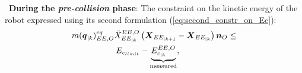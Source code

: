\documentclass[letterpaper, 10 pt, conference]{ieeeconf}      %
\newcommand{\vect}[1]{\mbox{\boldmath${#1}$}}%
\begin{document}
%
%
%
%
%
%
%
%
\textbullet\ \textbf{During the \textit{pre-collision} phase}: 
The constraint on the kinetic energy of the robot expressed using its second formulation (\ref{eq:second_constr_on_Ec}): 
\begin{equation} 
\begin{align*}
m(\vect{q}_{|k})_{EE,O}^{eq} \ddot{X}_{EE_{|k}}^{EE,O} &\left(\vect{X}_{EE_{|k+1}} - \vect{X}_{EE_{|k}}\right) \vect{n}_O \leq \\
\hspace{-10mm}E_{c_{limit}} &- \underbrace{E_{c_{|k}}^{EE,O}}_{\textnormal{measured}},
\end{align*}
\label{eq:Safe_constr_2_bis}
\end{equation}        
\end{document}
